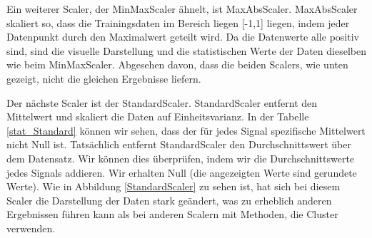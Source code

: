 \documentclass[12pt,a4paper]{scrartcl}
\numberwithin{equation}{section}
\begin{document}
 \begin{table}[ht!]
    \caption{Statistische Werte für jeden Sensor mit MinMaxScaler}
    \label{stat_MinMax}          
\end{table}

Ein weiterer Scaler, der MinMaxScaler ähnelt, ist MaxAbsScaler. MaxAbsScaler skaliert so, dass die Trainingsdaten im Bereich liegen [-1,1] liegen, indem jeder Datenpunkt durch den Maximalwert geteilt wird. Da die Datenwerte alle positiv sind, sind die visuelle Darstellung und die statistischen Werte der Daten dieselben wie beim MinMaxScaler. Abgesehen davon, dass die beiden Scalers, wie unten gezeigt, nicht die gleichen Ergebnisse liefern.

Der nächste Scaler ist der StandardScaler. StandardScaler entfernt den Mittelwert und skaliert die Daten auf Einheitsvarianz. In der Tabelle \ref{stat_Standard} können wir sehen, dass der für jedes Signal spezifische Mittelwert nicht Null ist. Tatsächlich entfernt StandardScaler den Durchschnittswert über dem Datensatz. Wir können dies überprüfen, indem wir die Durchschnittswerte jedes Signals addieren. Wir erhalten Null (die angezeigten Werte sind gerundete Werte). Wie in Abbildung \ref{StandardScaler} zu sehen ist, hat sich bei diesem Scaler die Darstellung der Daten stark geändert, was zu erheblich anderen Ergebnissen führen kann als bei anderen Scalern mit Methoden, die Cluster verwenden. 
\end{document}
